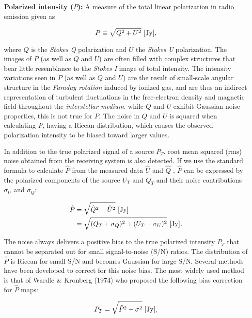 \documentclass[a4paper,10pt]{article}
\begin{document}
{\noindent}\textbf{Polarized intensity ($P$):} A measure of the total linear polarization in radio emission given as

\begin{align*}
    P\equiv\sqrt{Q^2+U^2} ~ [{\rm Jy}],
\end{align*}

{\noindent}where $Q$ is the \textit{Stokes Q} polarization and $U$ the \textit{Stokes U} polarization. The images of $P$ (as well as $Q$ and $U$) are often filled with complex structures that bear little resemblance to the \textit{Stokes I} image of total intensity. The intensity variations seen in $P$ (as well as $Q$ and $U$) are the result of small-scale angular structure in the \textit{Faraday rotation} induced by ionized gas, and are thus an indirect representation of turbulent fluctuations in the free-electron density and magnetic field throughout the \textit{interstellar medium}. while $Q$ and $U$ exhibit Gaussian noise properties, this is not true for $P$. The noise in $Q$ and $U$ is squared when calculating $P$, having a Ricean distribution, which causes the observed polarization intensity to be biased toward larger values.

{\noindent}In addition to the true polarized signal of a source $P_T$, root mean squared (rms) noise obtained from the receiving system is also detected. If we use the standard formula to calculate $\hat{P}$ from the measured data $\hat{U}$ and $\hat{Q}$ , $\hat{P}$ can be expressed by the polarized components of the source $U_T$ and $Q_T$ and their noise contributions $\sigma_U$ and $\sigma_Q$:

\begin{align*}
    \hat{P} &= \sqrt{\hat{Q}^2 + \hat{U}^2} ~ [{\rm Jy}] \\
                &= \sqrt{(Q_T+\sigma_Q)^2 + (U_T+\sigma_U)^2} ~ [{\rm Jy}].
\end{align*}

{\noindent}The noise always delivers a positive bias to the true polarized intensity $P_T$ that cannot be separated out for small signal-to-noise (S/N) ratios. The distribution of $\hat{P}$ is Ricean for small S/N and becomes Gaussian for large S/N. Several methods have been developed to correct for this noise bias. The most widely used method is that of Wardle \& Kronberg (1974) who proposed the following bias correction for $\hat{P}$ maps:

\begin{align*}
    P_T = \sqrt{\hat{P}^2 - \sigma^2} ~ [{\rm Jy}],
\end{align*}
\end{document}

